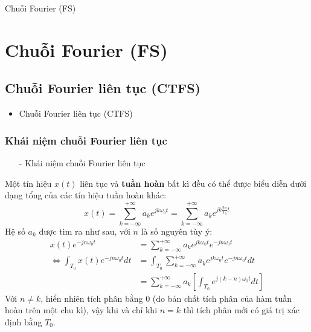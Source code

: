 \documentclass[8pt]{beamer}
\begin{document}
\begin{frame}{Chuỗi Fourier (FS)}
	\section{Chuỗi Fourier (FS)}
\subsection{Chuỗi Fourier liên tục (CTFS)}
\begin{itemize}
	\item Chuỗi Fourier liên tục (CTFS)
\end{itemize}
\subsubsection{Khái niệm chuỗi Fourier liên tục}
\begin{itemize}
	\item[-] Khái niệm chuỗi Fourier liên tục
\end{itemize}
Một tín hiệu $x(t)$ \alert{liên tục} và \textbf{tuần hoàn} bất kì đều có thể được biểu diễn dưới dạng tổng của các tín hiệu tuần hoàn khác:
$$x(t)=\sum_{k=-\infty}^{+\infty}a_{k}e^{jk\omega_{0} t}=\sum_{k=-\infty}^{+\infty}a_{k}e^{jk\frac{2\pi}{T_{0}}t}$$
Hệ số $a_{k}$ được tìm ra như sau, với $n$ là số nguyên tùy ý:
\begin{equation*}
\begin{split}
	x(t)e^{-jn\omega_{0}t}&=\sum_{k=-\infty}^{+\infty}a_{k}e^{jk\omega_{0}t}e^{-jn\omega_{0}t}
	\\ \Leftrightarrow \int_{T_{0}}x(t)e^{-jn\omega_{0}t}dt&=\int_{T_{0}}\sum_{k=-\infty}^{+\infty}a_{k}e^{jk\omega_{0}t}e^{-jn\omega_{0}t}dt\\
							       &=\sum_{k=-\infty}^{+\infty}a_{k}\left[\int_{T_{0}}e^{j(k-n)\omega_{0}t}dt\right]
\end{split}
\end{equation*}
Với $n\neq k$, hiển nhiên tích phân bằng $0$ (do bản chất tích phân của hàm tuần hoàn trên một chu kì), vậy khi và chỉ khi $n=k$ thì tích phân mới có giá trị xác định bằng $T_{0}$.
\end{frame}
\end{document}
